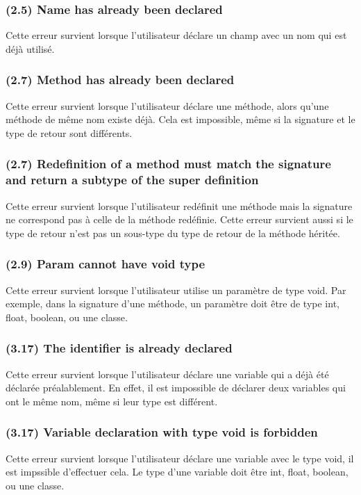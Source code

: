 \documentclass[12pt, a4paper, one side]{article}
\begin{document}
\subsubsection{(2.5) Name has already been declared}
Cette erreur survient lorsque l'utilisateur déclare un champ avec un nom qui est déjà utilisé.

\subsubsection{(2.7) Method has already been declared}
Cette erreur survient lorsque l'utilisateur déclare une méthode, alors qu'une méthode de même nom existe déjà. Cela est impossible, même si la signature et le type de retour sont différents.

\subsubsection{(2.7) Redefinition of a method must match the signature and return a subtype of the super definition}
Cette erreur survient lorsque l'utilisateur redéfinit une méthode mais la signature ne correspond pas à celle de la méthode redéfinie. Cette erreur survient aussi si le type de retour n'est pas un sous-type du type de retour de la méthode héritée.

\subsubsection{(2.9) Param cannot have void type}
Cette erreur survient lorsque l'utilisateur utilise un paramètre de type void. Par exemple, dans la signature d'une méthode, un paramètre doit être de type int, float, boolean, ou une classe.

\subsubsection{(3.17) The identifier is already declared}
Cette erreur survient lorsque l'utilisateur déclare une variable qui a déjà été déclarée préalablement. En effet, il est impossible de déclarer deux variables qui ont le même nom, même si leur type est différent.

\subsubsection{(3.17) Variable declaration with type void is forbidden}
Cette erreur survient lorsque l'utilisateur déclare une variable avec le type void, il est impssible d'effectuer cela. Le type d'une variable doit être int, float, boolean, ou une classe.
\end{document}
